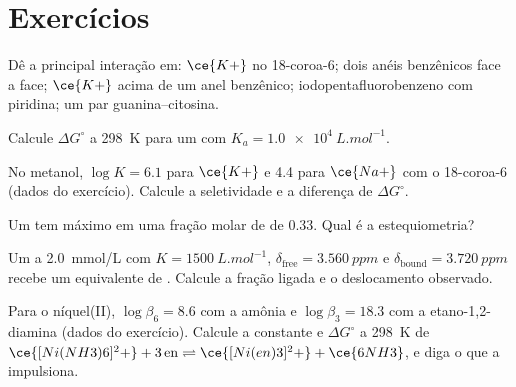 \section{Exercícios}

\begin{exercise}[$\star$]\label{exo:b3:supramolecular:1}
Dê a principal interação em: $\ce{K+}$ no 18-coroa-6; dois anéis benzênicos face a face;
$\ce{K+}$ acima de um anel benzênico; iodopentafluorobenzeno com piridina; um par
guanina--citosina.
\end{exercise}

\begin{exercise}[$\star$]\label{exo:b3:supramolecular:2}
Calcule $\Delta G^\circ$ a \qty{298}{K} para um  com $K_a = \qty{1.0e4}{L.mol^{-1}}$.
\end{exercise}

\begin{exercise}[$\star$]\label{exo:b3:supramolecular:3}
No metanol, $\log K = 6.1$ para $\ce{K+}$ e 4.4 para $\ce{Na+}$ com o 18-coroa-6 (dados do exercício).
Calcule a seletividade e a diferença de $\Delta G^\circ$.
\end{exercise}

\begin{exercise}[$\star$]\label{exo:b3:supramolecular:4}
Um  tem máximo em uma fração molar de  de 0.33. Qual é a estequiometria?
\end{exercise}

\begin{exercise}[$\star\star$]\label{exo:b3:supramolecular:5}
Um  a \qty{2.0}{mmol/L} com $K = \qty{1500}{L.mol^{-1}}$, $\delta_{\mathrm{free}} = \qty{3.560}{ppm}$ e $\delta_{\mathrm{bound}} = \qty{3.720}{ppm}$ recebe um
equivalente de . Calcule a fração ligada e o deslocamento observado.
\end{exercise}

\begin{exercise}[$\star\star$]\label{exo:b3:supramolecular:6}
Para o níquel(II), $\log\beta_6 = 8.6$ com a amônia e $\log\beta_3 = 18.3$ com a etano-1,2-diamina (dados do
exercício). Calcule a constante e $\Delta G^\circ$ a \qty{298}{K} de
$\ce{[Ni(NH3)6]^2+} + 3\,\mathrm{en} \rightleftharpoons \ce{[Ni(en)3]^2+} + \ce{6NH3}$, e diga o que a impulsiona.
\end{exercise}

